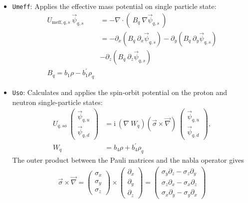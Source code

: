\documentclass[4p]{elsarticle}
\begin{document}
\begin{itemize}
\item \texttt{Umeff}: Applies the effective mass potential on single particle state: 
\begin{align}
U_{\mathrm{meff},q,s}   \: \vec{\psi}_{q,s}  & = - \nabla \cdot \left( \: B_q \: \nabla \vec{\psi}_{q,s} \: \right) \\
& = - \partial_x \left( B_q \: \partial_x \vec{\psi}_{q,s} \right) - \partial_y \left( B_q \: \partial_y \vec{\psi}_{q,s} \right) \nonumber\\
&- \partial_z \left( B_q \: \partial_z \vec{\psi}_{q,s} \right) \\
B_q = b_1 \rho - b_1^\prime \rho_q 
\label{Umeff_u}
\end{align}
\item \texttt{Uso}: Calculates and applies the spin-orbit potential on the proton and neutron single-particle states:
\begin{align}
U_{q,so} \: \begin{pmatrix} \vec{\psi}_{q,u} \\ \vec{\psi}_{q,d} \end{pmatrix} &= \mathrm{i} \: \left( \nabla \: W_q \right)  ( \vec{\sigma} \times \vec{\nabla} ) \: \begin{pmatrix} \vec{\psi}_{q,u} \\ \vec{\psi}_{q,d} \end{pmatrix}, \\
 W_q &= b_4 \rho + b_4^\prime \rho_q  
\end{align}
The outer product between the Pauli matrices and the nabla operator gives 
\begin{align}
 \vec{\sigma} \times  \vec{\nabla}  =  \begin{pmatrix} \sigma_x \\ \sigma_y \\ \sigma_z \end{pmatrix} \times \begin{pmatrix} \partial_x \\ \partial_y \\ \partial_z \end{pmatrix} = \begin{pmatrix} \sigma_y \partial_z -\sigma_z \partial_y \\ \sigma_z \partial_x - \sigma_x \partial_z \\ \sigma_x \partial_y - \sigma_y \partial_x \end{pmatrix} 
\end{align}

\end{itemize}
\end{document}
